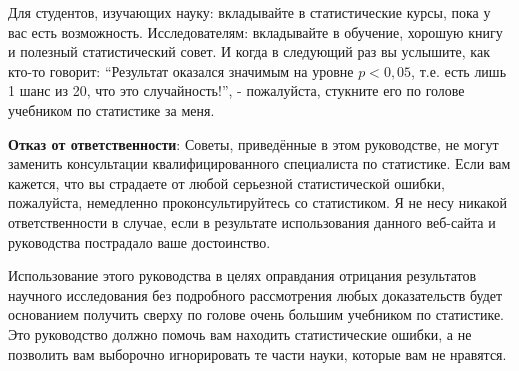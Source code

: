 Для студентов, изучающих науку: вкладывайте в статистические курсы, пока у вас есть возможность. Исследователям: вкладывайте в обучение, хорошую книгу и полезный статистический совет. И когда в следующий раз вы услышите, как кто-то говорит: ``Результат оказался значимым на уровне $p<0,05$, т.е. есть лишь 1 шанс из 20, что это случайность!'', - пожалуйста, стукните его по голове учебником по статистике за меня.

\textbf{Отказ от ответственности}: Советы, приведённые в этом руководстве, не могут заменить консультации квалифицированного специалиста по статистике. Если вам кажется, что вы страдаете от любой серьезной статистической ошибки, пожалуйста, немедленно проконсультируйтесь со статистиком. Я не несу никакой ответственности в случае, если в результате использования данного веб-сайта и руководства пострадало ваше достоинство.

Использование этого руководства в целях оправдания отрицания результатов научного исследования без подробного рассмотрения любых доказательств будет основанием получить сверху по голове очень большим учебником по статистике. Это руководство должно помочь вам находить статистические ошибки, а не позволить вам выборочно игнорировать те части науки, которые вам не нравятся.

